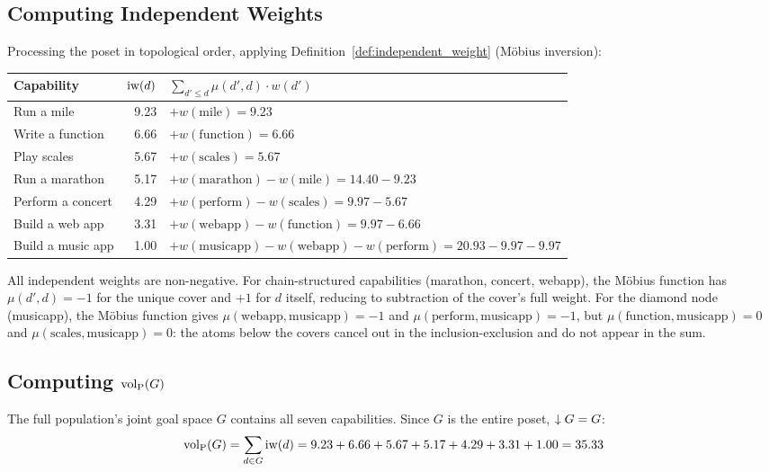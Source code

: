 \subsection{Computing Independent Weights}

Processing the poset in topological order, applying
Definition~\ref{def:independent_weight} (M\"{o}bius inversion):

\begin{center}
\begin{tabular}{@{}lrl@{}}
\toprule
\textbf{Capability} & $\operatorname{iw}(d)$ & $\sum_{d' \leq d} \mu(d', d) \cdot w(d')$ \\
\midrule
Run a mile        & 9.23 & $+w(\text{mile}) = 9.23$ \\
Write a function  & 6.66 & $+w(\text{function}) = 6.66$ \\
Play scales       & 5.67 & $+w(\text{scales}) = 5.67$ \\
Run a marathon    & 5.17 & $+w(\text{marathon}) - w(\text{mile}) = 14.40 - 9.23$ \\
Perform a concert & 4.29 & $+w(\text{perform}) - w(\text{scales}) = 9.97 - 5.67$ \\
Build a web app   & 3.31 & $+w(\text{webapp}) - w(\text{function}) = 9.97 - 6.66$ \\
Build a music app & 1.00 & $+w(\text{musicapp}) - w(\text{webapp}) - w(\text{perform}) = 20.93 - 9.97 - 9.97$ \\
\bottomrule
\end{tabular}
\end{center}

All independent weights are non-negative. For chain-structured capabilities
(marathon, concert, webapp), the M\"{o}bius function has $\mu(d', d) = -1$ for
the unique cover and $+1$ for $d$ itself, reducing to subtraction of the
cover's full weight. For the diamond node (musicapp), the M\"{o}bius function
gives $\mu(\text{webapp}, \text{musicapp}) = -1$ and $\mu(\text{perform},
\text{musicapp}) = -1$, but $\mu(\text{function}, \text{musicapp}) = 0$ and
$\mu(\text{scales}, \text{musicapp}) = 0$: the atoms below the covers cancel
out in the inclusion-exclusion and do not appear in the sum.

\subsection{Computing ${\operatorname{vol}_{\mathrm{P}}}(G)$}

The full population's joint goal space $G$ contains all seven capabilities.
Since $G$ is the entire poset, $\downarrow G = G$:
\[
{\operatorname{vol}_{\mathrm{P}}}(G) = \sum_{d \in G} \operatorname{iw}(d)
= 9.23 + 6.66 + 5.67 + 5.17 + 4.29 + 3.31 + 1.00
= 35.33
\]

